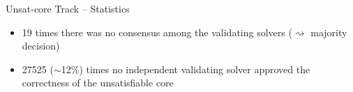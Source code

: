 \documentclass{beamer}
\begin{document}
\begin{frame}{Unsat-core Track -- Statistics}


\pause

\begin{itemize}
\item 19 times there was no consensus among the validating solvers ($\rightsquigarrow$ majority decision)
\item 27525 ($\sim$12\%) times no independent validating solver approved the correctness of the unsatisfiable core
\end{itemize}








\end{frame}
\end{document}

